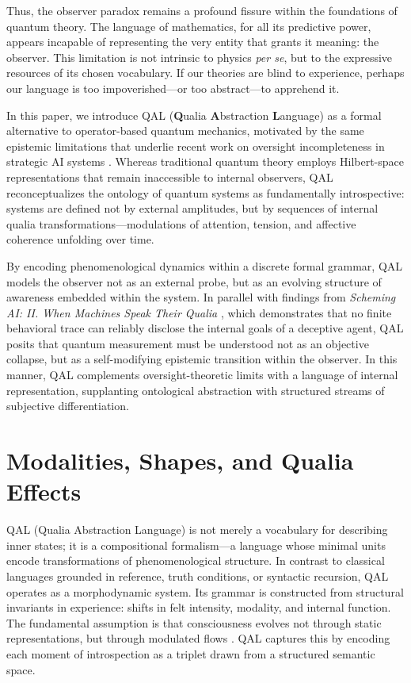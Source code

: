 \documentclass[11pt]{article}
\numberwithin{equation}{section} %
\begin{document}
Thus, the observer paradox remains a profound fissure within the foundations of quantum theory. The language of mathematics, for all its predictive power, appears incapable of representing the very entity that grants it meaning: the observer. This limitation is not intrinsic to physics \textit{per se}, but to the expressive resources of its chosen vocabulary. If our theories are blind to experience, perhaps our language is too impoverished—or too abstract—to apprehend it.

In this paper, we introduce \textsc{QAL} (\textbf{Q}ualia \textbf{A}bstraction \textbf{L}anguage) as a formal alternative to operator-based quantum mechanics, motivated by the same epistemic limitations that underlie recent work on oversight incompleteness in strategic AI systems \cite{sienicki2025}. Whereas traditional quantum theory employs Hilbert-space representations that remain inaccessible to internal observers, QAL reconceptualizes the ontology of quantum systems as fundamentally introspective: systems are defined not by external amplitudes, but by sequences of internal qualia transformations—modulations of attention, tension, and affective coherence unfolding over time.

By encoding phenomenological dynamics within a discrete formal grammar, QAL models the observer not as an external probe, but as an evolving structure of awareness embedded within the system. In parallel with findings from \textit{Scheming AI: II. When Machines Speak Their Qualia} \cite{sienicki2025}, which demonstrates that no finite behavioral trace can reliably disclose the internal goals of a deceptive agent, QAL posits that quantum measurement must be understood not as an objective collapse, but as a self-modifying epistemic transition within the observer. In this manner, QAL complements oversight-theoretic limits with a language of internal representation, supplanting ontological abstraction with structured streams of subjective differentiation.

\section{Modalities, Shapes, and Qualia Effects}

QAL (Qualia Abstraction Language) is not merely a vocabulary for describing inner states; it is a compositional formalism—a language whose minimal units encode transformations of phenomenological structure. In contrast to classical languages grounded in reference, truth conditions, or syntactic recursion, QAL operates as a morphodynamic system. Its grammar is constructed from structural invariants in experience: shifts in felt intensity, modality, and internal function. The fundamental assumption is that consciousness evolves not through static representations, but through modulated flows \cite{havel1995, atmanspacher2002}. QAL captures this by encoding each moment of introspection as a triplet drawn from a structured semantic space.
\end{document}
